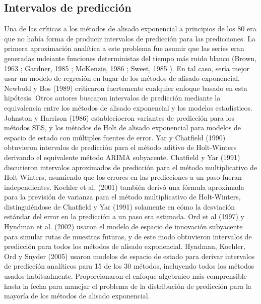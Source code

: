 \documentclass{llncs}
\begin{document}
\subsection{Intervalos de predicción}
Una de las críticas a los métodos de alisado exponencial a principios de los 80 era que no había forma de producir intervalos de predicción para las predicciones. La primera aproximación analítica a este problema fue asumir que las series eran generadas mdeiante funciones deterministas del tiempo más ruido blanco (Brown, 1963 \cite{Brown1963}; Gardner, 1985 \cite{GardnerES19851}; McKenzie, 1986 \cite{Mckenzie1986373}; Sweet, 1985 \cite{Sweet1985235}). En tal caso, sería mejor usar un modelo de regresión en lugar de los métodos de alisado exponencial. Newbold y Bos (1989) \cite{Newbold1989523} criticaron fuertemente cualquier enfoque basado en esta hipótesis.
Otros autores buscaron intervalos de predicción mediante la equivalencia entre los métodos de alisado exponencial y los modelos estadísticos. Johnston y Harrison (1986) \cite{Johnston1986303} establecioeron variantes de predicción para los métodos SES, y los métodos de Holt de alisado exponencial para modelos de espacio de estado con múltiples fuentes de error. Yar y Chatfield (1990) \cite{Yar1990127} obtuvieron intervalos de predicción para el método aditivo de Holt-Winters derivando el equivalente método ARIMA subyacente. Chatfield y Yar (1991) \cite{Chatfield199131} discutieron intervalos aproximados de predicción para el método multiplicativo de Holt-Winters, asumiendo que los errores en las predicciones a un paso fueran independientes. Koehler et al. (2001) \cite{Koehler2001269} también derivó una fórmula aproximada para la previsión de varianza para el método multiplicativo de Holt-Winters, distinguiéndose de Chatfield y Yar (1991) \cite{Chatfield199131} solamente en cómo la desviación estándar del error en la predicción a un paso era estimada.
Ord et al (1997) \cite{Ord19971621} y Hyndman et al. (2002) \cite{Hyndman2002439}  usaron el modelo de espacio de innovación subyacente para simular rutas de muestras futuras, y de este modo obtuvieron intervalos de predicción para todos los métodos de alisado exponencial. Hyndman, Koehler, Ord y Snyder (2005) \cite{Hyndman200517} usaron modelos de espacio de estado para derivar intervalos de predicción analíticos para 15 de los 30 métodos, incluyendo todos los métodos usados habitualmente. Proporcionaron el enfoque algebraico más comprensible hasta la fecha para manejar el problema de la distribución de predicción para la mayoría de los métodos de alisado exponencial.
\end{document}
